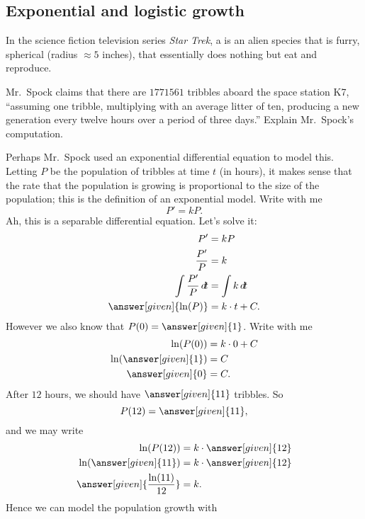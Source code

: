 \documentclass{ximera}
\begin{document}
\subsection{Exponential and logistic growth}

In the science fiction television series \textit{Star
  Trek}, a  is an alien species that is furry, spherical
(radius $\approx 5$ inches), that essentially does nothing but eat and
reproduce.

\begin{example}
  Mr.\ Spock claims that there are $1771561$ tribbles aboard the space
  station K7, ``assuming one tribble, multiplying with an average
  litter of ten, producing a new generation every twelve hours over a
  period of three days.'' Explain Mr.\ Spock's computation.
  \begin{explanation}
    Perhaps Mr.\ Spock used an exponential differential equation to
    model this.  Letting $P$ be the population of tribbles at time $t$
    (in hours), it makes sense that the rate that the population is
    growing is proportional to the size of the population; this is the
    definition of an exponential model. Write with me
    \[
    P' = k P.
    \]
    Ah, this is a separable differential equation. Let's solve it:
    \begin{align*}
      P' &= k P\\
      \frac{P'}{P} &= k\\
      \int \frac{P'}{P} \d t &= \int k\d t\\
      \answer[given]{\ln(P)} &= k\cdot t + C.
    \end{align*}
    However we also know that $P(0) = \answer[given]{1}$. Write with me
    \begin{align*}
      \ln(P(0)) &= k\cdot 0 + C\\
      \ln(\answer[given]{1}) &= C\\
      \answer[given]{0} &=C.
    \end{align*}
    After $12$ hours, we should have $\answer[given]{11}$ tribbles. So 
    \[
    P(12) = \answer[given]{11},
    \]
    and we may write
    \begin{align*}
      \ln(P(12)) &= k\cdot \answer[given]{12}\\
    \ln(\answer[given]{11}) &= k\cdot \answer[given]{12}\\
    \answer[given]{\frac{\ln(11)}{12}} &= k.
    \end{align*}
    Hence we can model the population growth with
    \begin{align*}

\end{align*}
\end{explanation}
\end{example}
\end{document}
